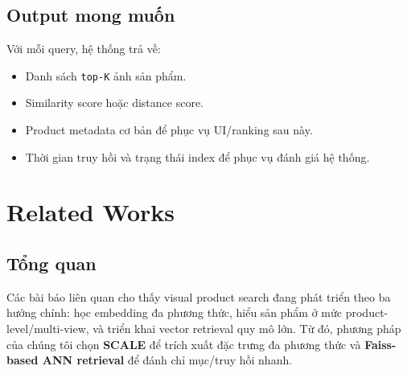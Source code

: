 \documentclass[12pt,a4paper]{article}
\begin{document}
\subsection{Output mong muốn}
Với mỗi query, hệ thống trả về:
\begin{itemize}
  \item Danh sách \texttt{top-K} ảnh sản phẩm.
  \item Similarity score hoặc distance score.
  \item Product metadata cơ bản để phục vụ UI/ranking sau này.
  \item Thời gian truy hồi và trạng thái index để phục vụ đánh giá hệ thống.
\end{itemize}

\section{Related Works}

\subsection{Tổng quan}
Các bài báo liên quan cho thấy visual product search đang phát triển theo ba hướng chính: học embedding đa phương thức, hiểu sản phẩm ở mức product-level/multi-view, và triển khai vector retrieval quy mô lớn. Từ đó, phương pháp của chúng tôi chọn \textbf{SCALE} để trích xuất đặc trưng đa phương thức và \textbf{Faiss-based ANN retrieval} để đánh chỉ mục/truy hồi nhanh.
\end{document}
